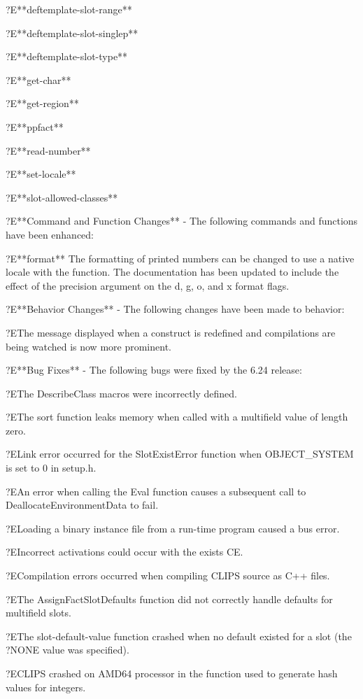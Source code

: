 \documentclass[letterpaper,10pt,english]{sphinxmanual}
\begin{document}
?E**deftemplate-slot-range**

?E**deftemplate-slot-singlep**

?E**deftemplate-slot-type**

?E**get-char**

?E**get-region**

?E**ppfact**

?E**read-number**

?E**set-locale**

?E**slot-allowed-classes**

?E**Command and Function Changes** - The following commands and
functions have been enhanced:

?E**format** The formatting of printed numbers can be changed to use a
native locale with the  function. The documentation has
been updated to include the effect of the precision argument on the d,
g, o, and x format flags.

?E**Behavior Changes** - The following changes have been made to
behavior:

?EThe message displayed when a construct is redefined and compilations
are being watched is now more prominent.

?E**Bug Fixes** - The following bugs were fixed by the 6.24 release:

?EThe DescribeClass macros were incorrectly defined.

?EThe sort function leaks memory when called with a multifield value of
length zero.

?ELink error occurred for the SlotExistError function when OBJECT\_SYSTEM
is set to 0 in setup.h.

?EAn error when calling the Eval function causes a subsequent call to
DeallocateEnvironmentData to fail.

?ELoading a binary instance file from a run-time program caused a bus
error.

?EIncorrect activations could occur with the exists CE.

?ECompilation errors occurred when compiling CLIPS source as C++ files.

?EThe AssignFactSlotDefaults function did not correctly handle defaults
for multifield slots.

?EThe slot-default-value function crashed when no default existed for a
slot (the ?NONE value was specified).

?ECLIPS crashed on AMD64 processor in the function used to generate hash
values for integers.
\end{document}
